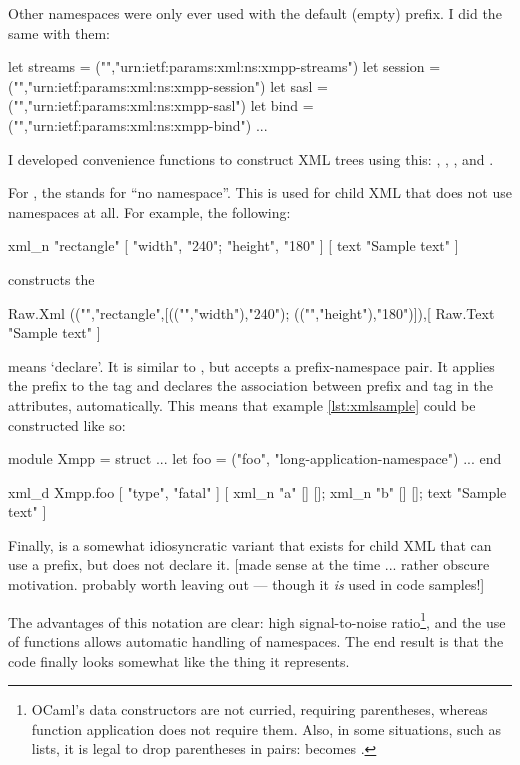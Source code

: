 \documentclass[12pt,a4paper,twoside,openright]{report}
\begin{document}
{Other namespaces were only ever used with the default (empty) prefix. I did the same with them:

\begin{ocaml}
let streams = ("","urn:ietf:params:xml:ns:xmpp-streams")
let session = ("","urn:ietf:params:xml:ns:xmpp-session")
let sasl    = ("","urn:ietf:params:xml:ns:xmpp-sasl")
let bind    = ("","urn:ietf:params:xml:ns:xmpp-bind")
...
\end{ocaml}

I developed convenience functions to construct XML trees using this: , , , and .

For , the  stands for ``no namespace''. This is used for child XML that does not use namespaces at all. For example, the following:
\begin{ocaml}
xml_n "rectangle" [ "width", "240"; "height", "180" ] [
  text "Sample text"
]
\end{ocaml} constructs the 
\begin{ocaml}
Raw.Xml (("","rectangle",[(("","width"),"240"); (("","height"),"180")]),[
  Raw.Text "Sample text"
]
\end{ocaml}

 means `declare'. It is similar to , but accepts a prefix-namespace pair. It applies the prefix to the tag and declares the association between prefix and tag in the attributes, automatically. This means that example \ref{lst:xmlsample} could be constructed like so:

\begin{ocaml}
module Xmpp = struct
  ...
  let foo = ("foo", "long-application-namespace")
  ...
end

xml_d Xmpp.foo [ "type", "fatal" ] [
  xml_n "a" [] [];
  xml_n "b" [] [];
  text "Sample text"
]
\end{ocaml}

Finally,  is a somewhat idiosyncratic variant that exists for child XML that can use a prefix, but does not declare it. [made sense at the time ... rather obscure motivation. probably worth leaving out --- though it \emph{is} used in code samples!]

The advantages of this notation are clear: high signal-to-noise ratio\footnote{OCaml's data constructors are not curried, requiring parentheses, whereas function application does not require them. Also, in some situations, such as lists, it is legal to drop parentheses in pairs: \code{[ (x,y); (z,w) ]} becomes \code{[ x,y; z,w ]}.}, and the use of functions allows automatic handling of namespaces. The end result is that the code finally looks somewhat like the thing it represents.

}
\end{document}
